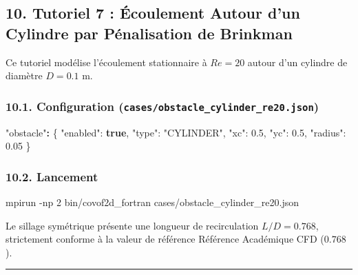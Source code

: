 \documentclass[
  french,
]{article}
\newenvironment{Shaded}{}{}
\newcommand{\AttributeTok}[1]{\textcolor[rgb]{0.49,0.56,0.16}{#1}}
\newcommand{\DataTypeTok}[1]{\textcolor[rgb]{0.56,0.13,0.00}{#1}}
\newcommand{\ErrorTok}[1]{\textcolor[rgb]{1.00,0.00,0.00}{\textbf{#1}}}
\newcommand{\ExtensionTok}[1]{#1}
\newcommand{\FloatTok}[1]{\textcolor[rgb]{0.25,0.63,0.44}{#1}}
\newcommand{\FunctionTok}[1]{\textcolor[rgb]{0.02,0.16,0.49}{#1}}
\newcommand{\KeywordTok}[1]{\textcolor[rgb]{0.00,0.44,0.13}{\textbf{#1}}}
\newcommand{\NormalTok}[1]{#1}
\newcommand{\StringTok}[1]{\textcolor[rgb]{0.25,0.44,0.63}{#1}}
\begin{document}
\subsection{10. Tutoriel 7 : Écoulement Autour d'un Cylindre par
Pénalisation de
Brinkman}\label{tutoriel-7-uxe9coulement-autour-dun-cylindre-par-puxe9nalisation-de-brinkman}

Ce tutoriel modélise l'écoulement stationnaire à \(Re=20\) autour d'un
cylindre de diamètre \(D=0.1\text{ m}\).

\subsubsection{\texorpdfstring{10.1. Configuration
(\texttt{cases/obstacle\_cylinder\_re20.json})}{10.1. Configuration (cases/obstacle\_cylinder\_re20.json)}}\label{configuration-casesobstacle_cylinder_re20.json}

\begin{Shaded}
\begin{Highlighting}[]
\StringTok{"obstacle"}\ErrorTok{:} \FunctionTok{\{}
  \DataTypeTok{"enabled"}\FunctionTok{:} \KeywordTok{true}\FunctionTok{,}
  \DataTypeTok{"type"}\FunctionTok{:} \StringTok{"CYLINDER"}\FunctionTok{,}
  \DataTypeTok{"xc"}\FunctionTok{:} \FloatTok{0.5}\FunctionTok{,} \DataTypeTok{"yc"}\FunctionTok{:} \FloatTok{0.5}\FunctionTok{,}
  \DataTypeTok{"radius"}\FunctionTok{:} \FloatTok{0.05}
\FunctionTok{\}}
\end{Highlighting}
\end{Shaded}

\subsubsection{10.2. Lancement}\label{lancement-3}

\begin{Shaded}
\begin{Highlighting}[]
\ExtensionTok{mpirun} \AttributeTok{{-}np}\NormalTok{ 2 bin/covof2d\_fortran cases/obstacle\_cylinder\_re20.json}
\end{Highlighting}
\end{Shaded}

Le sillage symétrique présente une longueur de recirculation
\(L/D = 0.768\), strictement conforme à la valeur de référence Référence
Académique CFD (\(0.768\)).

\begin{center}\rule{0.5\linewidth}{0.5pt}\end{center}
\end{document}
